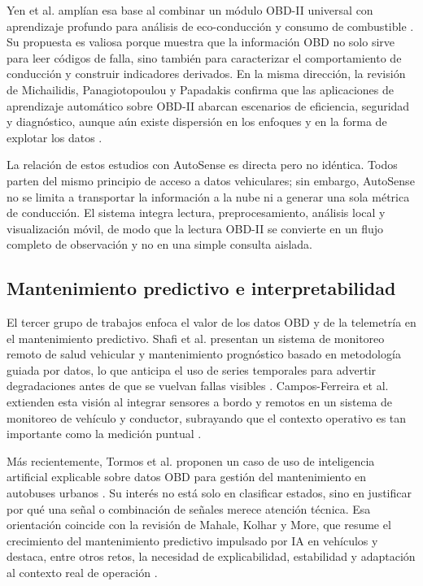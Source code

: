 \documentclass[12pt,letterpaper]{report}
\begin{document}
Yen et al. amplían esa base al combinar un módulo OBD-II universal con aprendizaje profundo para análisis de eco-conducción y consumo de combustible \cite{yen2021_universal_obdii}. Su propuesta es valiosa porque muestra que la información OBD no solo sirve para leer códigos de falla, sino también para caracterizar el comportamiento de conducción y construir indicadores derivados. En la misma dirección, la revisión de Michailidis, Panagiotopoulou y Papadakis confirma que las aplicaciones de aprendizaje automático sobre OBD-II abarcan escenarios de eficiencia, seguridad y diagnóstico, aunque aún existe dispersión en los enfoques y en la forma de explotar los datos \cite{michailidis2025_obdii_review}.

La relación de estos estudios con AutoSense es directa pero no idéntica. Todos parten del mismo principio de acceso a datos vehiculares; sin embargo, AutoSense no se limita a transportar la información a la nube ni a generar una sola métrica de conducción. El sistema integra lectura, preprocesamiento, análisis local y visualización móvil, de modo que la lectura OBD-II se convierte en un flujo completo de observación y no en una simple consulta aislada.

\subsection{Mantenimiento predictivo e interpretabilidad}

El tercer grupo de trabajos enfoca el valor de los datos OBD y de la telemetría en el mantenimiento predictivo. Shafi et al. presentan un sistema de monitoreo remoto de salud vehicular y mantenimiento prognóstico basado en metodología guiada por datos, lo que anticipa el uso de series temporales para advertir degradaciones antes de que se vuelvan fallas visibles \cite{shafi2018_vehicle_remote_health}. Campos-Ferreira et al. extienden esta visión al integrar sensores a bordo y remotos en un sistema de monitoreo de vehículo y conductor, subrayando que el contexto operativo es tan importante como la medición puntual \cite{camposferreira2023_vehicle_driver_monitoring}.

Más recientemente, Tormos et al. proponen un caso de uso de inteligencia artificial explicable sobre datos OBD para gestión del mantenimiento en autobuses urbanos \cite{tormos2025_explainable_ai}. Su interés no está solo en clasificar estados, sino en justificar por qué una señal o combinación de señales merece atención técnica. Esa orientación coincide con la revisión de Mahale, Kolhar y More, que resume el crecimiento del mantenimiento predictivo impulsado por IA en vehículos y destaca, entre otros retos, la necesidad de explicabilidad, estabilidad y adaptación al contexto real de operación \cite{mahale2025_review_predictive_maintenance}.
\end{document}
